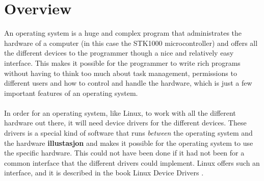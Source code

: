 \section{Overview}
An operating system is a huge and complex program that 
administrates the hardware of a computer (in this case the
STK1000 microcontroller) and offers all the different devices
to the programmer though a nice and relatively easy interface.
This makes it possible for the programmer to write rich
programs without having to think too much about task management,
permissions to different users and how to control and handle
the hardware, which is just a few important features of an
operating system.\\
\\
In order for an operating system, like Linux, 
to work with all the different hardware out there, it will need
device drivers for the different devices. These drivers is a 
special kind of software that runs \textit{between} the operating
system and the hardware \textbf{illustasjon} and makes it possible
for the operating system to use the specific hardware. This could
not have been done if it had not been for a common interface that 
the different drivers could implement. Linux offers such an 
interface, and it is described in the book 
Linux Device Drivers \cite{linux-device-drivers}.